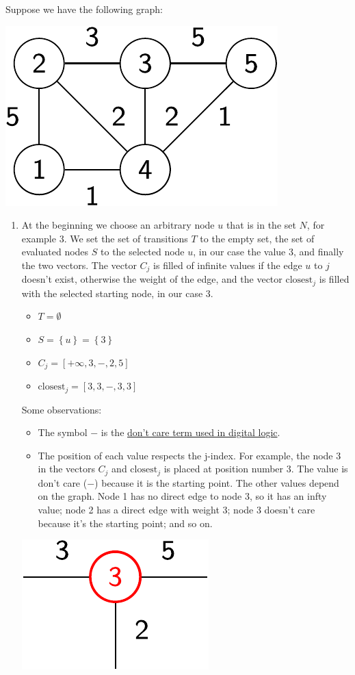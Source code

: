 \begin{examplebox}
    Suppose we have the following graph:
    \begin{center}
        \includegraphics[width=.3\textwidth]{img/prims-alg-1.pdf}
    \end{center}

    \begin{enumerate}
        \item At the beginning we choose an arbitrary node $u$ that is in the set $N$, for example $3$. We set the set of transitions $T$ to the empty set, the set of evaluated nodes $S$ to the selected node $u$, in our case the value 3, and finally the two vectors. The vector $C_{j}$ is filled of infinite values if the edge $u$ to $j$ doesn't exist, otherwise the weight of the edge, and the vector $\text{closest}_{j}$ is filled with the selected starting node, in our case 3.
        \begin{itemize}
            \item $T = \emptyset$
            \item $S = \left\{u\right\} = \left\{3\right\}$
            \item $C_{j} = \left[+\infty, 3, -, 2, 5\right]$
            \item $\text{closest}_{j} = \left[3, 3, -, 3, 3\right]$
        \end{itemize}
        Some observations:
        \begin{itemize}
            \item The symbol $-$ is the \href{https://en.wikipedia.org/wiki/Don%27t-care_term}{don't care term used in digital logic}.
            \item The position of each value respects the j-index. For example, the node 3 in the vectors $C_{j}$ and $\text{closest}_{j}$ is placed at position number 3. The value is don't care ($-$) because it is the starting point. The other values depend on the graph. Node 1 has no direct edge to node 3, so it has an infty value; node 2 has a direct edge with weight 3; node 3 doesn't care because it's the starting point; and so on.
        \end{itemize}
        \begin{center}
            \includegraphics[width=.2\textwidth]{img/prims-alg-2-imp.pdf}
        \end{center}


\end{enumerate}
\end{examplebox}
